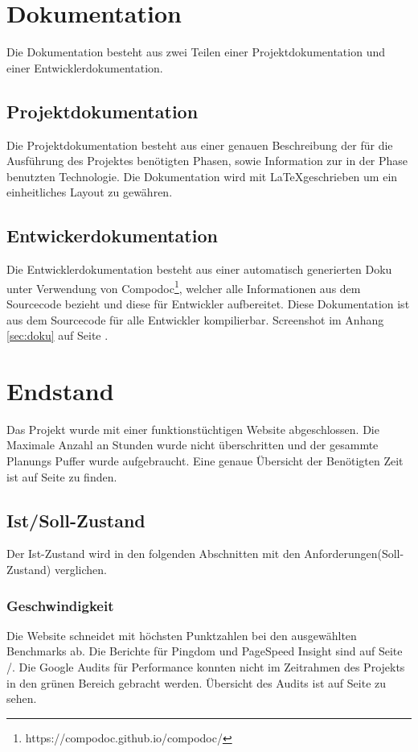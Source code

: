 \documentclass[11pt,a4paper]{article}
\begin{document}
\section{Dokumentation}
Die Dokumentation besteht aus zwei Teilen einer Projektdokumentation und einer Entwicklerdokumentation.
\subsection{Projektdokumentation}
Die Projektdokumentation besteht aus einer genauen Beschreibung der für die Ausführung des Projektes benötigten Phasen, sowie Information zur in der Phase benutzten Technologie.
Die Dokumentation wird mit \LaTeX geschrieben um ein einheitliches Layout zu gewähren.
\subsection{Entwickerdokumentation}
Die Entwicklerdokumentation besteht aus einer automatisch generierten Doku unter Verwendung von Compodoc\footnote{https://compodoc.github.io/compodoc/}, welcher alle Informationen aus dem Sourcecode bezieht und diese für Entwickler aufbereitet. Diese Dokumentation ist aus dem Sourcecode für alle Entwickler kompilierbar. Screenshot im Anhang \ref{sec:doku} auf Seite \pageref{sec:doku}.
\section{Endstand}
Das Projekt wurde mit einer funktionstüchtigen Website abgeschlossen. Die Maximale Anzahl an Stunden wurde nicht überschritten und der gesammte Planungs Puffer wurde aufgebraucht. Eine genaue Übersicht der Benötigten Zeit ist auf Seite \pageref{sec:time} zu finden.
\subsection{Ist/Soll-Zustand}
Der Ist-Zustand wird in den folgenden Abschnitten mit den Anforderungen(Soll-Zustand) verglichen.
\subsubsection{Geschwindigkeit}
Die Website schneidet mit höchsten Punktzahlen bei den ausgewählten Benchmarks ab.
Die Berichte für Pingdom und PageSpeed Insight sind auf Seite  \pageref{sec:google}/\pageref{sec:pingdom}. Die Google Audits für Performance konnten nicht im Zeitrahmen des Projekts in den grünen Bereich gebracht werden. Übersicht des Audits ist auf Seite \pageref{sec:audit}
zu sehen.
\end{document}
